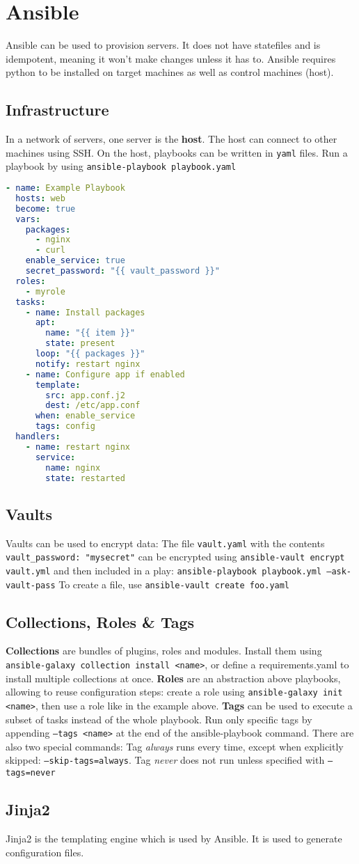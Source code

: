 \section{Ansible}
Ansible can be used to provision servers. It does not have statefiles and is idempotent, meaning it won't make changes unless it has to. Ansible requires python to be installed on target machines as well as control machines (host).
\subsection{Infrastructure}
In a network of servers, one server is the \textbf{host}. The host can connect to other machines using SSH. On the host, playbooks can be written in \texttt{yaml} files. Run a playbook by using \texttt{ansible-playbook playbook.yaml}

\begin{lstlisting}[language=yaml]
- name: Example Playbook
  hosts: web
  become: true
  vars:
    packages:
      - nginx
      - curl
    enable_service: true
    secret_password: "{{ vault_password }}"
  roles:
    - myrole
  tasks:
    - name: Install packages
      apt:
        name: "{{ item }}"
        state: present
      loop: "{{ packages }}"
      notify: restart nginx
    - name: Configure app if enabled
      template:
        src: app.conf.j2
        dest: /etc/app.conf
      when: enable_service
      tags: config
  handlers:
    - name: restart nginx
      service:
        name: nginx
        state: restarted
\end{lstlisting}
\subsection{Vaults}
Vaults can be used to encrypt data: The file \texttt{vault.yaml} with the contents \texttt{vault\string_password: "mysecret"} can be encrypted using \texttt{ansible-vault encrypt vault.yml} and then included in a play: \texttt{ansible-playbook playbook.yml --ask-vault-pass}
To create a file, use \texttt{ansible-vault create foo.yaml}
\subsection{Collections, Roles \& Tags}

\textbf{Collections} are bundles of plugins, roles and modules. Install them using \texttt{ansible-galaxy collection install <name>}, or define a requirements.yaml to install multiple collections at once.
\textbf{Roles} are an abstraction above playbooks, allowing to reuse configuration steps: create a role using \texttt{ansible-galaxy init <name>}, then use a role like in the example above.
\textbf{Tags} can be used to execute a subset of tasks instead of the whole playbook. Run only specific tags by appending \texttt{--tags <name>} at the end of the ansible-playbook command. There are also two special commands: Tag \textit{always} runs every time, except when explicitly skipped: \texttt{--skip-tags=always}. Tag \textit{never} does not run unless specified with \texttt{--tags=never}
\subsection{Jinja2}
Jinja2 is the templating engine which is used by Ansible. It is used to generate configuration files.
